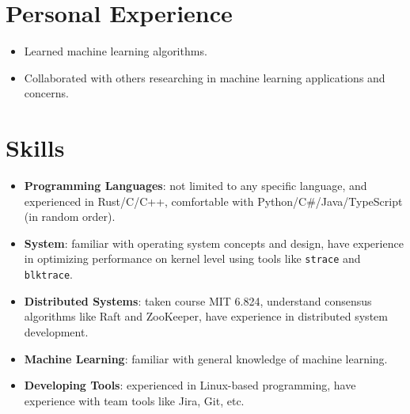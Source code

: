 \documentclass{resume}
\newcommand{\en}[1]{#1}
\newcommand{\zh}[1]{}
\begin{document}
\section{\en{Personal Experience}\zh{个人经历}}
\en{}
\zh{\datedsubsection{\textbf{英国剑桥大学人工智能暑期交流项目}}{2018/07 -- 2018/08}}
\en{}
\zh{\role{学生}{暑期交流}}
\begin{itemize}
      \item \en{Learned machine learning algorithms.}
            \zh{学习了经典机器学习算法}
      \item \en{Collaborated with others researching in machine learning applications and concerns.}
            \zh{在小组中担任领导角色，负责了小组展示的选题与组织}
\end{itemize}

\section{\en{Skills}\zh{技能}}
\begin{itemize}[parsep=0.25ex]
      \item \en{\textbf{Programming Languages}:
                  not limited to any specific language,
                  and experienced in Rust/C/C++,
                  comfortable with Python/C\#/Java/TypeScript (in random order).}
            \zh{\textbf{编程语言}:
                  熟悉各种编程语言，尤其熟悉 Rust/C/C++ 等，
                  了解 Python/C\#/Java/TypeScript 等（不分先后）}

      \item \en{\textbf{System}:
                  familiar with operating system concepts and design,
                  have experience in optimizing performance on kernel level using tools
                  like \texttt{strace} and \texttt{blktrace}.}
            \zh{\textbf{系统}:
                  熟悉各种操作系统内核的概念与设计，熟悉各种内核性能调优工具，例如 \texttt{strace} 和 \texttt{blktrace}}

      \item \en{\textbf{Distributed Systems}:
                  taken course MIT 6.824,
                  understand consensus algorithms like Raft and ZooKeeper,
                  have experience in distributed system development.}
            \zh{\textbf{分布式系统}:
                  熟悉 ZooKeeper 与 Raft 算法，有分布式系统开发经验}

      \item \en{\textbf{Machine Learning}:
                  familiar with general knowledge of machine learning.}
            \zh{\textbf{机器学习}:
                  熟悉经典机器学习算法}

      \item \en{\textbf{Developing Tools}:
                  experienced in Linux-based programming,
                  have experience with team tools like Jira, Git, etc.}
            \zh{\textbf{开发工具}:
                  十分熟悉 Linux，有 Jira、Git 等团队合作工具的经验}
\end{itemize}
\end{document}
